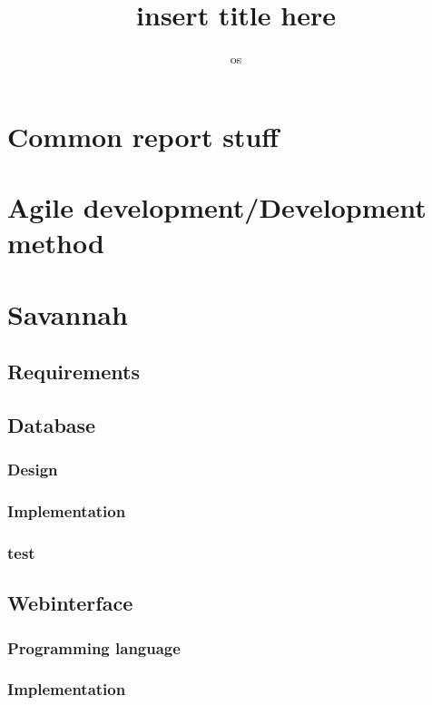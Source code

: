 

\title{insert title here}
\author{os}


\maketitle
\tableofcontents




\chapter{Common report stuff} %
\chapter{Agile development/Development method} %
\chapter{Savannah} %
  \section{Requirements}
  \section{Database}
    \subsection{Design}
    \subsection{Implementation}
    \subsection{test}

  \section{Webinterface}
     \subsection{Programming language}
      
     \subsection{Implementation}
